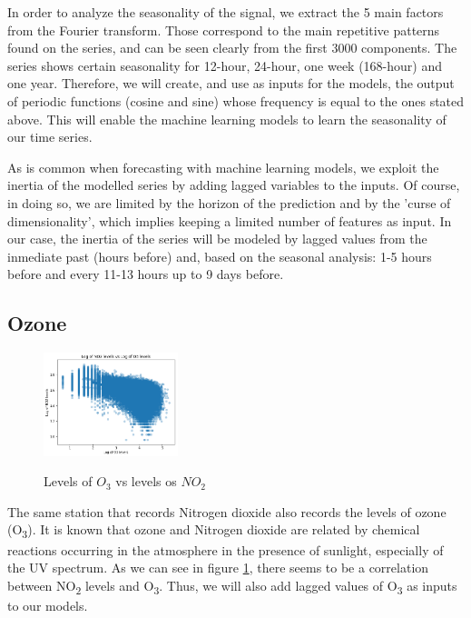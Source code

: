 \documentclass[a4paper,twocolumn,5p]{elsarticle}
\begin{document}
In order to analyze the seasonality of the signal, we extract the 5
main factors from the Fourier transform. Those correspond to the main
repetitive patterns found on the series, and can be seen clearly from
the first 3000 components. The series shows certain seasonality for
12-hour, 24-hour, one week (168-hour) and one year.  Therefore, we will
create, and use as inputs for the models, the output of periodic
functions (cosine and sine) whose frequency is equal to the ones
stated above. This will enable the machine learning models to learn
the seasonality of our time series.

As is common when forecasting with machine learning models, we exploit
the inertia of the modelled series by adding lagged variables to the
inputs. Of course, in doing so, we are limited by the horizon of the
prediction and by the 'curse of dimensionality', which implies keeping
a limited number of features as input. In our case, the inertia of the
series will be modeled by lagged values from the inmediate past (hours
before) and, based on the seasonal analysis: 1-5 hours before and
every 11-13 hours up to 9 days before.

\subsection{Ozone}

\begin{figure}
  \centering
  \includegraphics[width=0.35\textwidth]{no2vso3}
  \label{figure:no2vso3}
  \caption{Levels of $O_3$ vs levels os $NO_2$}
\end{figure}

The same station that records Nitrogen dioxide also records the levels
of ozone (O\textsubscript{3}). It is known that ozone and Nitrogen
dioxide are related by chemical reactions occurring in the atmosphere
in the presence of sunlight, especially of the UV spectrum.  As we can
see in figure \ref{figure:no2vso3}, there seems to be a correlation
between NO\textsubscript{2} levels and O\textsubscript{3}. Thus, we
will also add lagged values of O\textsubscript{3} as inputs to our
models.
\end{document}
